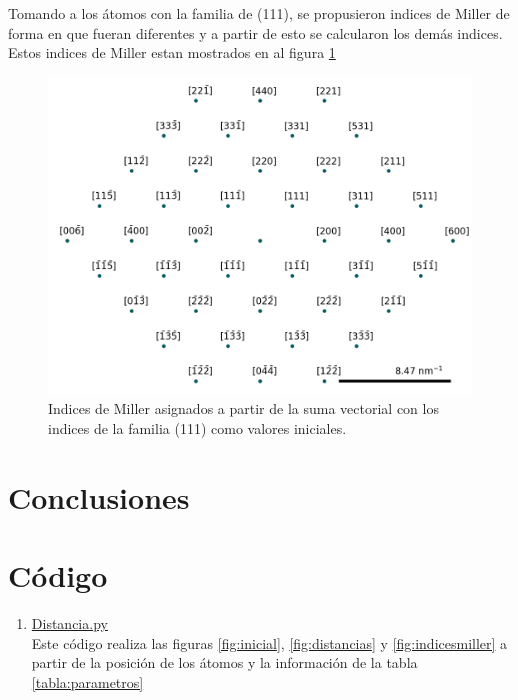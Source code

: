 \documentclass[reprint,amsmath,amssymb,aps,]{revtex4-2}
\begin{document}
Tomando a los átomos con la familia de (111), se propusieron indices de Miller de forma en que fueran diferentes y a partir de esto se calcularon 
los demás indices. Estos indices de Miller estan mostrados en al figura \ref{fig:lattice}
\begin{figure}[H]
    \centering
    \includegraphics[scale=0.4]{../Graphics/lattice.png}
    \caption{Indices de Miller asignados a partir de la suma vectorial con los indices de la familia (111) como valores iniciales.}
    \label{fig:lattice}
\end{figure}
\section{Conclusiones}
\section{Código}
\begin{enumerate}
    \item \href{https://github.com/giovannilopez9808/Notas_Agosto_2020/blob/master/AMC/Tarea2/distancia.py}{Distancia.py\label{cod:distancias}}\\
    Este código realiza las figuras \ref{fig:inicial}, \ref{fig:distancias} y \ref{fig:indicesmiller} a partir de la posición de los átomos y la información de la tabla \ref{tabla:parametros}
\end{enumerate}

\nocite{*}

\end{document}
